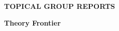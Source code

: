 

  \vfill

\begin{center}
\begin{Huge}   {\bf  TOPICAL GROUP REPORTS}

\bigskip

\bigskip

 {\bf Theory Frontier }

\vfill

\vfill

\end{Huge}
\end{center}

\newpage
\thispagestyle{empty}
\mbox{\null}


